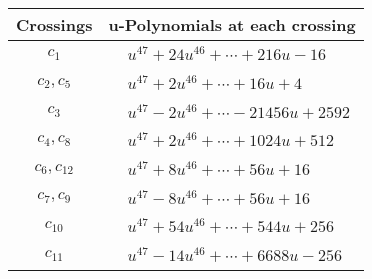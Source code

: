 \documentclass[1p]{elsarticle_modified}
\theoremstyle{definition}
\begin{document}
\begin{tabular}{m{50pt}|m{274pt}}
Crossings & \hspace{64pt}u-Polynomials at each crossing \\
\hline $$\begin{aligned}c_{1}\end{aligned}$$&$\begin{aligned}
&u^{47}+24 u^{46}+\cdots+216 u-16
\end{aligned}$\\
\hline $$\begin{aligned}c_{2},c_{5}\end{aligned}$$&$\begin{aligned}
&u^{47}+2 u^{46}+\cdots+16 u+4
\end{aligned}$\\
\hline $$\begin{aligned}c_{3}\end{aligned}$$&$\begin{aligned}
&u^{47}-2 u^{46}+\cdots-21456 u+2592
\end{aligned}$\\
\hline $$\begin{aligned}c_{4},c_{8}\end{aligned}$$&$\begin{aligned}
&u^{47}+2 u^{46}+\cdots+1024 u+512
\end{aligned}$\\
\hline $$\begin{aligned}c_{6},c_{12}\end{aligned}$$&$\begin{aligned}
&u^{47}+8 u^{46}+\cdots+56 u+16
\end{aligned}$\\
\hline $$\begin{aligned}c_{7},c_{9}\end{aligned}$$&$\begin{aligned}
&u^{47}-8 u^{46}+\cdots+56 u+16
\end{aligned}$\\
\hline $$\begin{aligned}c_{10}\end{aligned}$$&$\begin{aligned}
&u^{47}+54 u^{46}+\cdots+544 u+256
\end{aligned}$\\
\hline $$\begin{aligned}c_{11}\end{aligned}$$&$\begin{aligned}
&u^{47}-14 u^{46}+\cdots+6688 u-256
\end{aligned}$\\
\hline
\end{tabular}\\~\\
\end{document}
